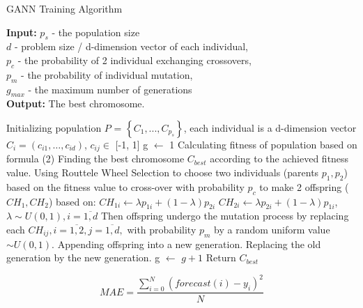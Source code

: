 \documentclass[conference]{IEEEtran}
\begin{document}
\begin{algorithm}[h]
	\caption{GANN Training Algorithm}\label{algo_GA}
	\hspace*{\algorithmicindent} \textbf{Input:} 
	\textbf{ $p_s$ } - the population size \\
	\hspace*{\algorithmicindent} \textbf{$d$} - problem size / d-dimension vector of each individual,\\
	\hspace*{\algorithmicindent} \textbf{ $p_c$ } - the probability of 2 individual exchanging crossovers,\\
	\hspace*{\algorithmicindent} \textbf{$p_m$ } - the probability of individual mutation, \\
	\hspace*{\algorithmicindent} \textbf{$g_{max}$} - the maximum number of generations \\
	\hspace*{\algorithmicindent} \textbf{Output:} The best chromosome. 
	
	\begin{algorithmic}[1]
		\STATE Initializing population $P$ = $ \left\{ C_1,. . . , C_{p_s} \right\}$, each individual is a d-dimension vector $C_i = (c_{i1}, …, c_{id})$, $c_{ij} \in $ [-1, 1]
		\STATE g $\leftarrow$ 1 
		\STATE Calculating fitness of population based on formula (2)
		\STATE Finding the best chromosome $C_{best}$ according to the achieved fitness value.
		\REPEAT 
		\STATE Using Routtele Wheel Selection to choose two individuals (parents $p_1, p_2$) based on the fitness value to cross-over with probability $p_c$ to make 2 offspring ($CH_1, CH_2$)  based on:
		\STATE 	$CH_{1i} \leftarrow \lambda p_{1i} + (1- \lambda)p_{2i}$
		\STATE	$CH_{2i} \leftarrow \lambda p_{2i} + (1- \lambda)p_{1i}$, 		$ \lambda \sim U(0,1), i = \overline{1, d} $
		\STATE Then offspring undergo  the mutation process by replacing each $CH_{ij}, i = \overline{1, 2}, j = \overline{1, d},$ with probability $p_m$ by a random uniform value $\sim U(0,1)$.
		\STATE Appending offspring into a new generation.
		\STATE Replacing the old generation by the new generation. 
		\STATE g $\leftarrow$ $g + 1$
		\ENDWHILE
		\STATE Return $C_{best}$
	\end{algorithmic}
\end{algorithm}

\begin{equation} 
MAE = \frac{\sum_{i=0}^N( forecast(i) - y_i)^2}{N}	\label{eq_MAE}
\end{equation}
\end{document}
